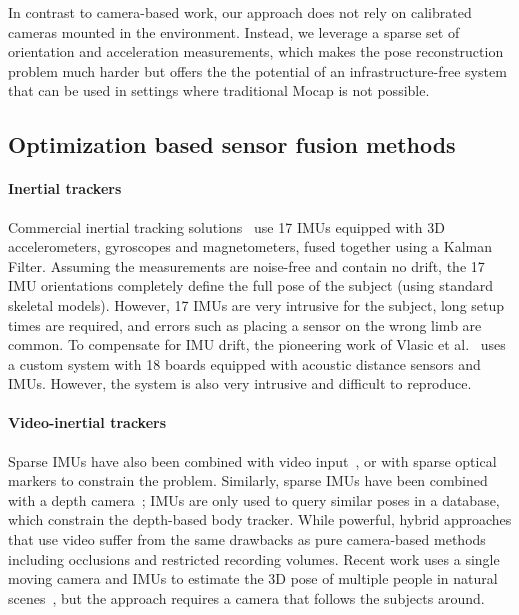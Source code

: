 \documentclass[acmtog]{acmart}
\begin{document}
In contrast to camera-based work, our approach does not rely on calibrated cameras mounted in the environment. Instead, we leverage a sparse set of orientation and acceleration measurements, which makes the pose reconstruction problem much harder but offers the the potential of an infrastructure-free system that can be used in settings where traditional Mocap is not possible. 

\subsection{Optimization based sensor fusion methods}\paragraph{Inertial trackers} Commercial inertial tracking solutions~\cite{roetenberg2007moven} use 17 IMUs equipped with 3D accelerometers, gyroscopes and magnetometers, fused together using a Kalman Filter. Assuming the measurements are noise-free and contain no drift, the 17 IMU orientations completely define the full pose of the subject (using standard skeletal models). However, 17 IMUs are very intrusive for the subject, long setup times are required, and errors such as placing a sensor on the wrong limb are common. To compensate for IMU drift, the pioneering work of Vlasic et al.~ uses a custom  system with 18 boards equipped with acoustic distance sensors and IMUs.  
However, the system is also very intrusive and difficult to reproduce. 

\paragraph{Video-inertial trackers} Sparse IMUs have also been combined with video input~\cite{ponsmollCVPR2010,Pons-Moll2011,Marcard2016,mallesonreal}, or with sparse optical markers \cite{andrews2016real} to constrain the problem. Similarly, sparse IMUs have been combined with a depth camera~\cite{helten2013real}; IMUs are only used to query similar poses in a database, which constrain the depth-based body tracker. While powerful, hybrid approaches that use video suffer from the same drawbacks as pure camera-based methods including occlusions and restricted recording volumes. Recent work uses a single moving camera and IMUs to estimate the 3D pose of multiple people in natural scenes~\cite{vonMarcard2018}, but the approach requires a camera that follows the subjects around.
\end{document}
